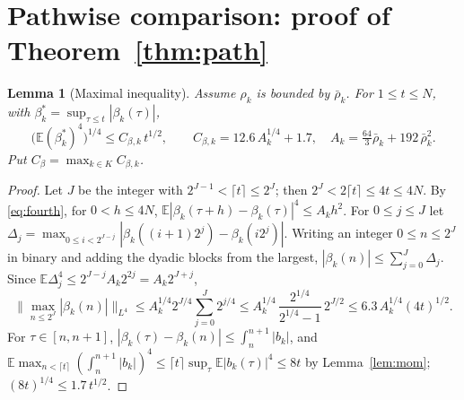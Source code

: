 \documentclass[11pt]{article}
\newcommand{\E}{\mathbb{E}}
\newcommand{\bbar}{\bar\rho}
\newtheorem{lemma}[theorem]{Lemma}
\theoremstyle{remark}
\begin{document}
\section{Pathwise comparison: proof of Theorem~\ref{thm:path}}

\begin{lemma}[Maximal inequality]\label{lem:max}
Assume $\rho_k$ is bounded by $\bbar_k$. For $1\le t\le N$, with
$\beta_k^*=\sup_{\tau\le t}|\beta_k(\tau)|$,
\begin{equation}
  \bigl(\E(\beta_k^*)^4\bigr)^{1/4}\le C_{\beta,k}\,t^{1/2},\qquad
  C_{\beta,k}=12.6\,A_k^{1/4}+1.7,\quad
  A_k=\tfrac{64}{3}\bbar_k+192\,\bbar_k^2 .
  \label{eq:Cbeta}
\end{equation}
Put $C_\beta=\max_{k\in K}C_{\beta,k}$.
\end{lemma}

\begin{proof}
Let $J$ be the integer with $2^{J-1}<\lceil t\rceil\le2^J$; then
$2^J<2\lceil t\rceil\le4t\le4N$. By \eqref{eq:fourth}, for $0<h\le4N$,
$\E|\beta_k(\tau+h)-\beta_k(\tau)|^4\le A_kh^2$. For $0\le j\le J$ let
$\Delta_j=\max_{0\le i<2^{J-j}}|\beta_k((i+1)2^j)-\beta_k(i2^j)|$. Writing
an integer $0\le n\le2^J$ in binary and adding the dyadic blocks from the
largest, $|\beta_k(n)|\le\sum_{j=0}^J\Delta_j$. Since
$\E\Delta_j^4\le2^{J-j}A_k2^{2j}=A_k2^{J+j}$,
\[
  \bigl\|\max_{n\le2^J}|\beta_k(n)|\bigr\|_{L^4}
  \le A_k^{1/4}2^{J/4}\sum_{j=0}^J2^{j/4}
  \le A_k^{1/4}\,\frac{2^{1/4}}{2^{1/4}-1}\,2^{J/2}
  \le6.3\,A_k^{1/4}(4t)^{1/2}.
\]
For $\tau\in[n,n+1]$, $|\beta_k(\tau)-\beta_k(n)|\le\int_n^{n+1}|b_k|$, and
$\E\max_{n<\lceil t\rceil}(\int_n^{n+1}|b_k|)^4
\le\lceil t\rceil\sup_\tau\E|b_k(\tau)|^4\le8t$ by Lemma~\ref{lem:mom};
$(8t)^{1/4}\le1.7\,t^{1/2}$.
\end{proof}
\end{document}
